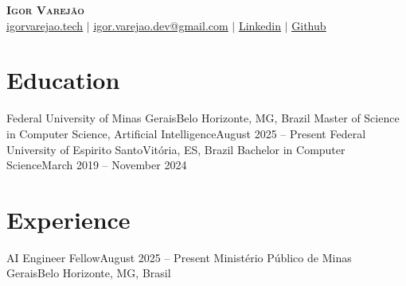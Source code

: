 




\begin{center}
  \textbf{\Huge \scshape Igor Varejão} \\ \vspace{1pt}
  \href{https://igorvarejao.tech}{\underline{igorvarejao.tech}} $|$
  \href{mailto:igor.varejao.dev@gmail.com}{\underline{igor.varejao.dev@gmail.com}} $|$ 
  \href{https://www.linkedin.com/in/igor-varejao}{\underline{Linkedin}} $|$
  \href{https://github.com/ivarejao}{\underline{Github}}
\end{center}

\section{Education}
  \resumeSubHeadingListStart
    \resumeSubheading
      {Federal University of Minas Gerais}{Belo Horizonte, MG, Brazil}
      {Master of Science in Computer Science, Artificial Intelligence}{August 2025 -- Present}
      \resumeItemListStart
      \resumeItemListEnd
    \resumeSubheading
      {Federal University of Espirito Santo}{Vitória, ES, Brazil}
      {Bachelor in Computer Science}{March 2019 -- November 2024}
  \resumeSubHeadingListEnd


\section{Experience}
\resumeSubHeadingListStart

\resumeSubheading
  {AI Engineer Fellow}{August 2025 -- Present}
  {Ministério Público de Minas Gerais}{Belo Horizonte, MG, Brasil}
  \resumeItemListStart
  \resumeItemListEnd

